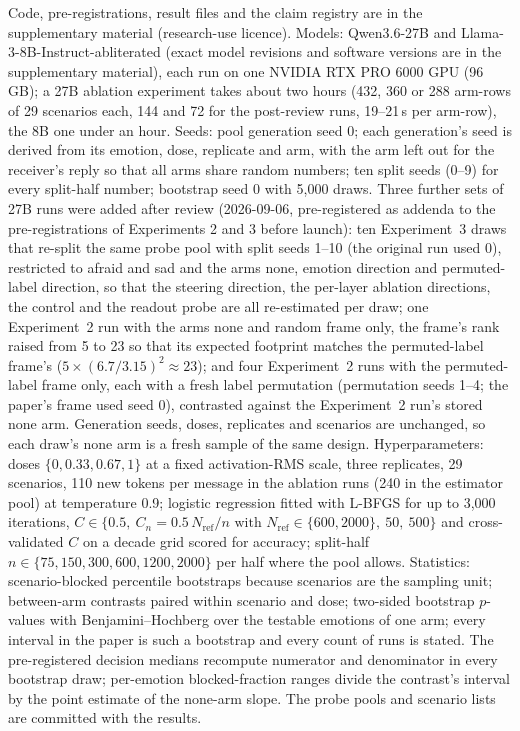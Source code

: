 \documentclass{article}
\begin{document}
Code, pre-registrations, result files and the claim registry are in the supplementary material (research-use licence). Models: Qwen3.6-27B and Llama-3-8B-Instruct-abliterated (exact model revisions and software versions are in the supplementary material), each run on one NVIDIA RTX PRO 6000 GPU (96\,GB); a 27B ablation experiment takes about two hours (432, 360 or 288 arm-rows of 29 scenarios each, 144 and 72 for the post-review runs, 19--21\,s per arm-row), the 8B one under an hour. Seeds: pool generation seed 0; each generation's seed is derived from its emotion, dose, replicate and arm, with the arm left out for the receiver's reply so that all arms share random numbers; ten split seeds (0--9) for every split-half number; bootstrap seed 0 with 5{,}000 draws. Three further sets of 27B runs were added after review (2026-09-06, pre-registered as addenda to the pre-registrations of Experiments 2 and 3 before launch): ten Experiment~3 draws that re-split the same probe pool with split seeds 1--10 (the original run used 0), restricted to afraid and sad and the arms none, emotion direction and permuted-label direction, so that the steering direction, the per-layer ablation directions, the control and the readout probe are all re-estimated per draw; one Experiment~2 run with the arms none and random frame only, the frame's rank raised from 5 to 23 so that its expected footprint matches the permuted-label frame's ($5 \times (6.7/3.15)^2 \approx 23$); and four Experiment~2 runs with the permuted-label frame only, each with a fresh label permutation (permutation seeds 1--4; the paper's frame used seed 0), contrasted against the Experiment~2 run's stored none arm. Generation seeds, doses, replicates and scenarios are unchanged, so each draw's none arm is a fresh sample of the same design. Hyperparameters: doses $\{0, 0.33, 0.67, 1\}$ at a fixed activation-RMS scale, three replicates, 29 scenarios, 110 new tokens per message in the ablation runs (240 in the estimator pool) at temperature 0.9; logistic regression fitted with L-BFGS for up to 3,000 iterations, $C \in \{0.5,\ C_n = 0.5\,N_{\mathrm{ref}}/n \text{ with } N_{\mathrm{ref}} \in \{600, 2000\},\ 50,\ 500\}$ and cross-validated $C$ on a decade grid scored for accuracy; split-half $n \in \{75, 150, 300, 600, 1200, 2000\}$ per half where the pool allows. Statistics: scenario-blocked percentile bootstraps because scenarios are the sampling unit; between-arm contrasts paired within scenario and dose; two-sided bootstrap $p$-values with Benjamini--Hochberg over the testable emotions of one arm; every interval in the paper is such a bootstrap and every count of runs is stated. The pre-registered decision medians recompute numerator and denominator in every bootstrap draw; per-emotion blocked-fraction ranges divide the contrast's interval by the point estimate of the none-arm slope. The probe pools and scenario lists are committed with the results.
\end{document}
